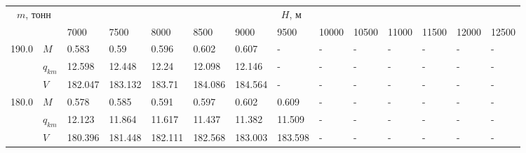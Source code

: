 \begin{tabular}{|l|l|llllllllllll|}\hline
\multicolumn{2}{|c|}{$m$, тонн}& \multicolumn{12}{c|}{$H$, м}\\ 
 \cline{3-14}
 \multicolumn{2}{|c|}{}&     7000 &     7500 &     8000 &                      8500 &                      9000 &                      9500 &                     10000 &                     10500 &                     11000 &                     11500 &                     12000 &                     12500 \\
\hline
190.0 & $M$ &    0.583 &     0.59 &    0.596 &    0.602\cellcolor{green} &                     0.607 &                         - &                         - &                         - &                         - &                         - &                         - &                         - \\
      & $q_{km}$ &   12.598 &   12.448 &    12.24 &   12.098\cellcolor{green} &                    12.146 &                         - &                         - &                         - &                         - &                         - &                         - &                         - \\
      & $V$ &  182.047 &  183.132 &   183.71 &  184.086\cellcolor{green} &                   184.564 &                         - &                         - &                         - &                         - &                         - &                         - &                         - \\
\hline
180.0 & $M$ &    0.578 &    0.585 &    0.591 &                     0.597 &    0.602\cellcolor{green} &                     0.609 &                         - &                         - &                         - &                         - &                         - &                         - \\
      & $q_{km}$ &   12.123 &   11.864 &   11.617 &                    11.437 &   11.382\cellcolor{green} &                    11.509 &                         - &                         - &                         - &                         - &                         - &                         - \\
      & $V$ &  180.396 &  181.448 &  182.111 &                   182.568 &  183.003\cellcolor{green} &                   183.598 &                         - &                         - &                         - &                         - &                         - &                         - \\

\end{tabular}
